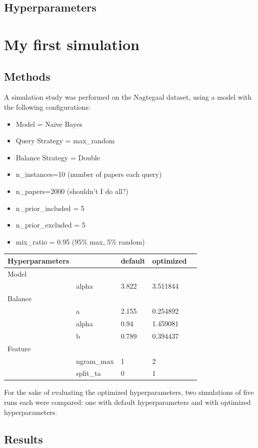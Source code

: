 \documentclass[
]{book}
\providecommand{\tightlist}{%
  \setlength{\itemsep}{0pt}\setlength{\parskip}{0pt}}
\begin{document}
\hypertarget{hyperparameters}{%
\section{Hyperparameters}\label{hyperparameters}}

\hypertarget{my-first-simulation}{%
\chapter{My first simulation}\label{my-first-simulation}}

\hypertarget{methods}{%
\section{Methods}\label{methods}}

A simulation study was performed on the Nagtegaal dataset, using a model with the following configurations:

\begin{itemize}
\tightlist
\item
  Model = Naive Bayes
\item
  Query Strategy = max\_random
\item
  Balance Strategy = Double
\item
  n\_instances=10 (number of papers each query)
\item
  n\_papers=2000 (shouldn't I do all?)
\item
  n\_prior\_included = 5
\item
  n\_prior\_excluded = 5
\item
  mix\_ratio = 0.95 (95\% max, 5\% random)
\end{itemize}

\begin{longtable}[]{@{}lllll@{}}
\toprule
Hyperparameters & & default & optimized &\tabularnewline
\midrule
\endhead
Model & & & &\tabularnewline
& alpha & 3.822 & 3.511844 &\tabularnewline
Balance & & & &\tabularnewline
& a & 2.155 & 0.254892 &\tabularnewline
& alpha & 0.94 & 1.459081 &\tabularnewline
& b & 0.789 & 0.394437 &\tabularnewline
Feature & & & &\tabularnewline
& ngram\_max & 1 & 2 &\tabularnewline
& split\_ta & 0 & 1 &\tabularnewline
\bottomrule
\end{longtable}

For the sake of evaluating the optimized hyperparameters, two simulations of five runs each were compared: one with default hyperparameters and with optimized hyperparameters.

\hypertarget{results}{%
\section{Results}\label{results}}
\end{document}
